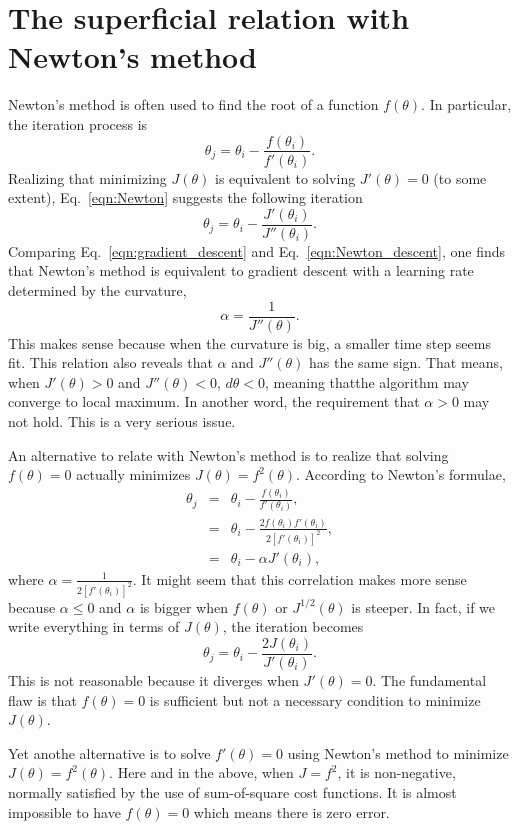 \section{The superficial relation with Newton's method}
Newton's method is often used to find the root of a function $f(\theta)$. In particular, the iteration process is
\begin{equation}
\theta_j = \theta_i - \frac{f(\theta_i)}{f'(\theta_i)}.\label{eqn:Newton}
\end{equation}
Realizing that minimizing $J(\theta)$ is equivalent to solving $J'(\theta) = 0$ (to some extent), Eq.~\ref{eqn:Newton} suggests the following iteration
\begin{equation}
\theta_j = \theta_i - \frac{J'(\theta_i)}{J''(\theta_i)}.\label{eqn:Newton_descent}
\end{equation}
Comparing Eq.~\ref{eqn:gradient_descent} and Eq.~\ref{eqn:Newton_descent}, one finds that Newton's method is equivalent to gradient descent with a learning rate determined by the curvature,
\begin{equation}
\alpha = \frac{1}{J''(\theta)}.
\end{equation}
This makes sense because when the curvature is big, a smaller time step seems fit. This relation also reveals that $\alpha$ and $J''(\theta)$ has the same sign. That means, when $J'(\theta)>0$ and $J''(\theta)<0$, $d\theta<0$, meaning thatthe algorithm may converge to local maximum. In another word, the requirement that $\alpha > 0$ may not hold. This is a very serious issue.

An alternative to relate with Newton's method is to realize that solving $f(\theta)=0$ actually minimizes $J(\theta)=f^2(\theta)$. According to Newton's formulae,
\begin{eqnarray}
\theta_j&=&\theta_i-\frac{f(\theta_i)}{f'(\theta_i)},\\
	&=&\theta_i-\frac{2f(\theta_i)f'(\theta_i)}{2[f'(\theta_i)]^2},\\
	&=&\theta_i-\alpha J'(\theta_i),
\end{eqnarray}
where $\alpha=\frac{1}{2[f'(\theta_i)]^2}$. It might seem that this correlation makes more sense because $\alpha\leq 0$ and $\alpha$ is bigger when $f(\theta)$ or $J^{1/2}(\theta)$ is steeper. In fact, if we write everything in terms of $J(\theta)$, the iteration becomes
\begin{equation}
\theta_j=\theta_i-\frac{2J(\theta_i)}{J'(\theta_i)}.
\end{equation}
This is not reasonable because it diverges when $J'(\theta)=0$. The fundamental flaw is that $f(\theta)=0$ is sufficient but not a necessary condition to minimize $J(\theta)$. 

Yet anothe alternative is to solve $f'(\theta)=0$ using Newton's method to minimize $J(\theta)=f^2(\theta)$. Here and in the above, when $J=f^2$, it is non-negative, normally satisfied by the use of sum-of-square cost functions. It is almost impossible to have $f(\theta)=0$ which means there is zero error.
